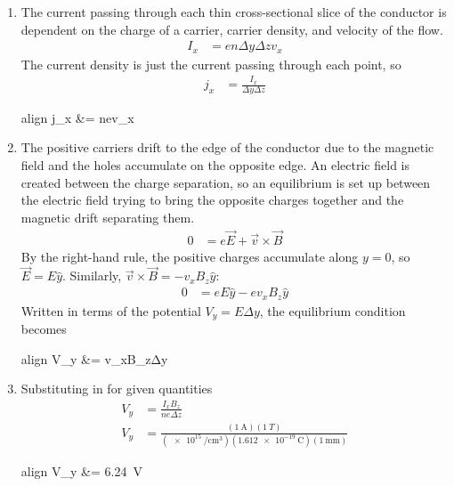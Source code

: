 \begin{enumerate}
	\item
		The current passing through each thin cross-sectional slice of the
		conductor is dependent on the charge of a carrier, carrier density,
		and velocity of the flow.
		\begin{align*}
			I_x &= enΔyΔzv_x
		\end{align*}
		The current density is just the current passing through each point, so
		\begin{align*}
			j_x &= \frac{I_x}{ΔyΔz}
		\end{align*}
		\begin{empheq}[box=\fbox]{align}
			j_x &= nev_x
		\end{empheq}
	\item
		The positive carriers drift to the edge of the conductor due to the
		magnetic field and the holes accumulate on the opposite edge. An
		electric field is created between the charge separation, so an
		equilibrium is set up between the electric field trying to bring the
		opposite charges together and the magnetic drift separating them.
		\begin{align*}
			0 &= e\vec E + \vec v × \vec B
		\end{align*}
		By the right-hand rule, the positive charges accumulate along $y=0$, so
		$\vec E = E \hat y$. Similarly, $\vec v × \vec B = -v_xB_z\hat y$:
		\begin{align*}
			0 &= eE\hat y - ev_xB_z\hat y
		\end{align*}
		Written in terms of the potential $V_y = EΔy$, the equilibrium
		condition becomes
		\begin{empheq}[box=\fbox]{align}
			V_y &= v_xB_zΔy
		\end{empheq}
	\item
		Substituting in for given quantities
		\begin{align*}
			V_y &= \frac{I_x B_z}{neΔz} \\
			V_y &= \frac{(\SI{1}{\A})(\SI{1}{T})}
				{(\SI[per-mode=reciprocal]{e15}{\per\cm\cubed})
				 (\SI{1.612e-19}{\coulomb})(\SI{1}{\mm})}
		\end{align*}
		\begin{empheq}[box=\fbox]{align}
			V_y &= \SI{6.24}{\V}
		\end{empheq}
\end{enumerate}
